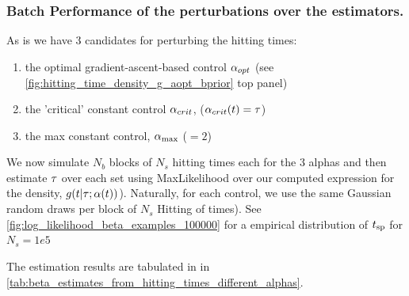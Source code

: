 \subsubsection{Batch Performance of the perturbations over the estimators.}
As is we have 3 candidates for perturbing the hitting times: 
\begin{enumerate}
  \item 
the optimal gradient-ascent-based  control $\alpha_{opt}$ (see
\cref{fig:hitting_time_density_g_aopt_bprior} top panel)
\item   the 'critical' constant control
$\alpha_{crit}$, ($\alpha_{crit}(t) =  { \tau }$)
\item  the max constant control, ${ \alpha_{\textrm{max}} }$ ($=2$)
\end{enumerate} 

We now simulate $N_b $ blocks of $N_s $ hitting times each for the
3 alphas and then estimate ${ \tau }$ over each set using MaxLikelihood over our
computed expression for the density, $g(t|{ \tau }; \alpha(t) )$). 
Naturally, for each control, we use the same Gaussian random draws per block of
$N_s$ Hitting of times). See \cref{fig:log_likelihood_beta_examples_100000} for
a empirical distribution of ${ t_{\textrm{sp} } }$ for $N_s = 1e5$

The estimation results are tabulated in in
\cref{tab:beta_estimates_from_hitting_times_different_alphas}.


